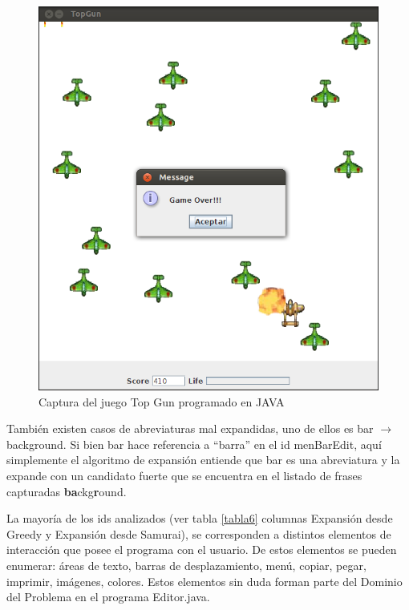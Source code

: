 \begin{figure}[h!] %
\centerline{%
\includegraphics[scale= 0.72]{./cap4/caso_03.png}
}
\caption{Captura del juego Top Gun programado en JAVA}
\label{caso3}
\end{figure}

También existen casos de abreviaturas mal expandidas, uno de ellos es \textsf{bar} $\rightarrow$ \textsf{background}. Si bien \textsf{bar} hace referencia a “barra” en el id \textsf{menBarEdit}, aquí simplemente el algoritmo de expansión entiende que \textsf{bar} es una abreviatura y la expande con un candidato fuerte que se encuentra en el listado de frases capturadas \textsf{\textbf{ba}ckg\textbf{r}ound}.

La mayoría de los ids analizados (ver tabla \ref{tabla6} columnas Expansión desde Greedy y Expansión desde Samurai), se corresponden a distintos elementos de interacción que posee el programa con el usuario. De estos elementos se pueden enumerar: áreas de texto, barras de desplazamiento, menú, copiar, pegar, imprimir, imágenes, colores. Estos elementos sin duda forman parte del Dominio del Problema en el programa Editor.java.


